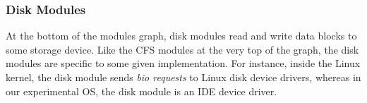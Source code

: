 \subsubsection{Disk Modules}
\label{sec:modules:disk}
At the bottom of the modules graph, disk modules read and write data blocks
to some storage device. Like the CFS modules at the very top of the graph,
the disk modules are specific to some given implementation. For instance,
inside the Linux kernel, the disk module sends \emph{bio requests} to Linux
disk device drivers, whereas in our experimental OS, the disk module is an IDE
device driver.


